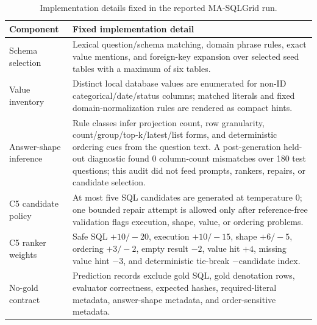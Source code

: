 \documentclass[11pt]{article}
\begin{document}
\begin{table}[htbp]
\caption{Implementation details fixed in the reported MA-SQLGrid run.}
\label{tab:sup-implementation}
\centering
\small
\begin{tabularx}{\textwidth}{p{}X}
\toprule
\textbf{Component} & \textbf{Fixed implementation detail} \\
\midrule
Schema selection & Lexical question/schema matching, domain phrase rules, exact value mentions, and foreign-key expansion over selected seed tables with a maximum of six tables. \\
Value inventory & Distinct local database values are enumerated for non-ID categorical/date/status columns; matched literals and fixed domain-normalization rules are rendered as compact hints. \\
Answer-shape inference & Rule classes infer projection count, row granularity, count/group/top-k/latest/list forms, and deterministic ordering cues from the question text. A post-generation held-out diagnostic found 0 column-count mismatches over 180 test questions; this audit did not feed prompts, rankers, repairs, or candidate selection. \\
C5 candidate policy & At most five SQL candidates are generated at temperature 0; one bounded repair attempt is allowed only after reference-free validation flags execution, shape, value, or ordering problems. \\
C5 ranker weights & Safe SQL $+10/-20$, execution $+10/-15$, shape $+6/-5$, ordering $+3/-2$, empty result $-2$, value hit $+4$, missing value hint $-3$, and deterministic tie-break $-\text{candidate index}$. \\
No-gold contract & Prediction records exclude gold SQL, gold denotation rows, evaluator correctness, expected hashes, required-literal metadata, answer-shape metadata, and order-sensitive metadata. \\
\bottomrule
\end{tabularx}
\end{table}
\end{document}
